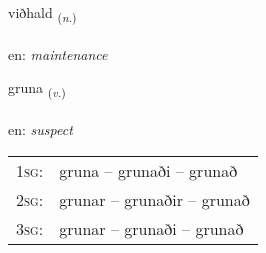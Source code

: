 \documentclass[frontgrid, backgrid]{flacards}\usepackage[]{graphicx}\usepackage[]{xcolor}
\begin{document}
\renewcommand{\flhead}{\vskip5pt \fboxsep=0pt {\small\bfseries\footnotesize Nafnorð | Noun}}
\renewcommand{\fcfoot}{\vskip5pt \fboxsep=0pt \hspace{2pt}{\small\bfseries\footnotesize 3K}}

\renewcommand{\blhead}{\vskip5pt {\small\bfseries\footnotesize Nafnorð | Noun }}
\renewcommand{\bcfoot}{\vskip5pt \hspace{2pt}{\small\bfseries\footnotesize 3K}}


{viðhald \small{\textsubscript{(\textit{n.})}} \\[1ex] %
\textphonetic{[vɪθhalt]} \\
en: \emph{maintenance} \\  [2ex]
\renewcommand*{\arraystretch}{0.8}
}

\renewcommand{\flhead}{\vskip5pt \fboxsep=0pt {\small\bfseries\footnotesize Sagnorð | Verb}}
\renewcommand{\fcfoot}{\vskip5pt \fboxsep=0pt \hspace{2pt}{\small\bfseries\footnotesize 3K}}

\renewcommand{\blhead}{\vskip5pt {\small\bfseries\footnotesize Sagnorð | Verb }}
\renewcommand{\bcfoot}{\vskip5pt \hspace{2pt}{\small\bfseries\footnotesize 3K}}


{gruna \small{\textsubscript{(\textit{v.})}} \\[1ex] %
\textphonetic{[krʏːna]} \\
en: \emph{suspect} \\  [2ex]
\renewcommand*{\arraystretch}{0.8}
\begin{tabular}{p{1cm}l}
\textsc{1sg}: & gruna -- grunaði -- grunað \\ 
\textsc{2sg}: & grunar -- grunaðir -- grunað \\ 
\textsc{3sg}: & grunar -- grunaði -- grunað \\ 
\end{tabular}
}
\end{document}
